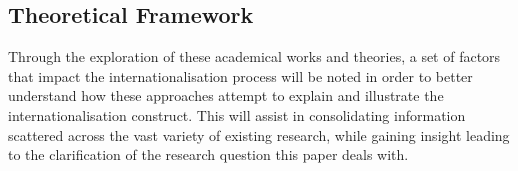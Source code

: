 \documentclass[11pt,a4paper]{article}
\begin{document}
\subsection{Theoretical Framework}
  \vspace{-1mm}

 \par 
Through the exploration of these academical works and theories, a set of factors that impact the internationalisation process will be noted in order to better understand how these approaches attempt to explain and illustrate the internationalisation construct. This will assist in consolidating information scattered across the vast variety of existing research, while gaining insight leading to the clarification of the research question this paper deals with. 
\newpage
\end{document}
